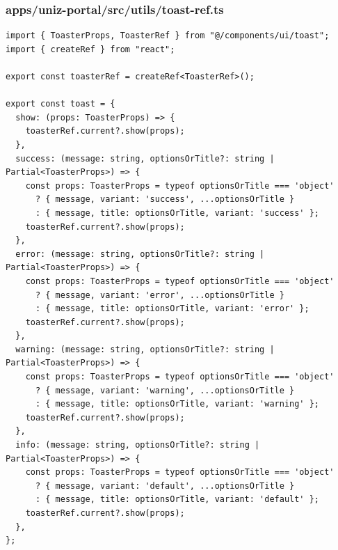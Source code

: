 \documentclass[11pt,a4paper,oneside]{article}
\begin{document}
\subsubsection*{apps/uniz-portal/src/utils/toast-ref.ts}
\begin{lstlisting}
import { ToasterProps, ToasterRef } from "@/components/ui/toast";
import { createRef } from "react";

export const toasterRef = createRef<ToasterRef>();

export const toast = {
  show: (props: ToasterProps) => {
    toasterRef.current?.show(props);
  },
  success: (message: string, optionsOrTitle?: string | Partial<ToasterProps>) => {
    const props: ToasterProps = typeof optionsOrTitle === 'object' 
      ? { message, variant: 'success', ...optionsOrTitle }
      : { message, title: optionsOrTitle, variant: 'success' };
    toasterRef.current?.show(props);
  },
  error: (message: string, optionsOrTitle?: string | Partial<ToasterProps>) => {
    const props: ToasterProps = typeof optionsOrTitle === 'object' 
      ? { message, variant: 'error', ...optionsOrTitle }
      : { message, title: optionsOrTitle, variant: 'error' };
    toasterRef.current?.show(props);
  },
  warning: (message: string, optionsOrTitle?: string | Partial<ToasterProps>) => {
    const props: ToasterProps = typeof optionsOrTitle === 'object' 
      ? { message, variant: 'warning', ...optionsOrTitle }
      : { message, title: optionsOrTitle, variant: 'warning' };
    toasterRef.current?.show(props);
  },
  info: (message: string, optionsOrTitle?: string | Partial<ToasterProps>) => {
    const props: ToasterProps = typeof optionsOrTitle === 'object' 
      ? { message, variant: 'default', ...optionsOrTitle }
      : { message, title: optionsOrTitle, variant: 'default' };
    toasterRef.current?.show(props);
  },
};

\end{lstlisting}
\end{document}

